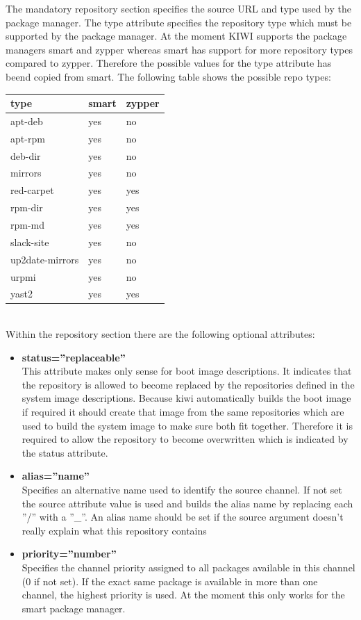 The mandatory repository section specifies the source URL and
type used by the package manager. The type attribute specifies the
repository type which must be supported by the package manager.
At the moment KIWI supports the package managers smart and zypper
whereas smart has support for more repository types compared to
zypper. Therefore the possible values for the type attribute has
beend copied from smart. The following table shows the possible
repo types: 

\begin{tabular}[h]{|p{4cm}|p{2cm}|p{2cm}|}
\hline
\textbf{type} & \textbf{smart} & \textbf{zypper} \\
\hline
apt-deb            & yes & no  \\
apt-rpm            & yes & no  \\
deb-dir            & yes & no  \\
mirrors            & yes & no  \\
red-carpet         & yes & yes \\
rpm-dir            & yes & yes \\
rpm-md             & yes & yes \\ 
slack-site         & yes & no  \\
up2date-mirrors    & yes & no  \\
urpmi              & yes & no  \\
yast2              & yes & yes \\
\hline
\end{tabular}\\

Within the repository section there are the following optional
attributes:

\begin{itemize}
\item \textbf{status=''replaceable''}\\
      This attribute makes only sense for boot image descriptions.
      It indicates that the repository is allowed to become replaced by
      the repositories defined in the system image descriptions. Because kiwi
      automatically builds the boot image if required it should create that
      image from the same repositories which are used to build the system
      image to make sure both fit together. Therefore it is required to allow
      the repository to become overwritten which is indicated by the status
      attribute.
\item \textbf{alias=''name''}\\
      Specifies an alternative name used to identify the source channel.
      If not set the source attribute value is used and builds the alias name
      by replacing each ''/'' with a ''\_''. An alias name should be set if
      the source argument doesn't really explain what this repository
      contains 
\item \textbf{priority=''number''}\\
      Specifies the channel priority assigned to all packages available in
      this channel (0 if not set). If the exact same package
      is available in more than one channel, the highest priority is used.
      At the moment this only works for the smart package manager.
\end{itemize}

